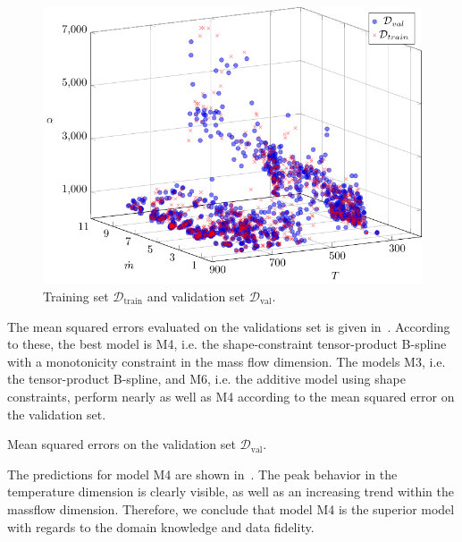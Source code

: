 \begin{figure}[H]
	\centering
	\includegraphics[width=\columnwidth]{graphics/pgfplots/cha5/train-val-split.pdf}
	\caption{Training set $\mathcal{D}_{\text{train}}$ and validation set $\mathcal{D}_{\text{val}}$.}
	\label{fig:ebner-train-val-split}
\end{figure}
%
The mean squared errors evaluated on the validations set is given in~. According to these, the best model is M4, i.e. the shape-constraint tensor-product B-spline with a monotonicity constraint in the mass flow dimension. The models M3, i.e. the tensor-product B-spline, and M6, i.e. the additive model using shape constraints, perform nearly as well as M4 according to the mean squared error on the validation set. 

\begin{table}[H]
	\begin{center}
	\end{center}
	\caption{Mean squared errors on the validation set $\mathcal{D}_{\text{val}}$.}
	\label{tab:ebner-mse-val}
\end{table}

The predictions for model M4 are shown in~. The peak behavior in the temperature dimension is clearly visible, as well as an increasing trend within the massflow dimension. Therefore, we conclude that model M4 is the superior model with regards to the domain knowledge and data fidelity. 

